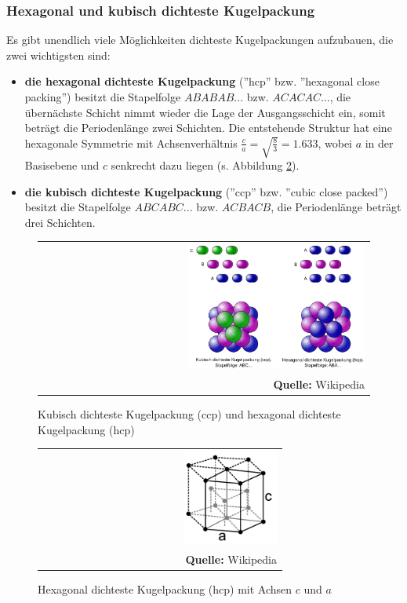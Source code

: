 \documentclass[a4paper,titlepage]{scrartcl}
\numberwithin{equation}{section}
\begin{document}
\subsubsection{Hexagonal und kubisch dichteste Kugelpackung}
Es gibt unendlich viele Möglichkeiten dichteste Kugelpackungen aufzubauen, die zwei wichtigsten sind:
\begin{itemize}
\item \textbf{die hexagonal dichteste Kugelpackung} (''hcp'' bzw. ''hexagonal close packing'') besitzt die Stapelfolge $ABABAB...$ bzw. $ACACAC...$, die übernächste Schicht nimmt wieder die Lage der Ausgangsschicht ein, somit beträgt die Periodenlänge zwei Schichten. Die entstehende Struktur hat eine hexagonale Symmetrie mit Achsenverhältnis $\frac{c}{a}=\sqrt{\frac{8}{3}}=1.633$, wobei $a$ in der Basisebene und $c$ senkrecht dazu liegen (s. Abbildung \ref{fig:hexagonalkugel}).
\item \textbf{die kubisch dichteste Kugelpackung} (''ccp'' bzw. ''cubic close packed'') besitzt die Stapelfolge $ABCABC...$ bzw. $ACBACB$, die Periodenlänge beträgt drei Schichten.
\end{itemize}
\begin{figure}[H]
	\centering
	\begin{tabular}{@{}r@{}}
		\includegraphics[width=0.55\textwidth]{images/DichtesteKugelpackung.png}\\
		\footnotesize\sffamily\textbf{Quelle:} Wikipedia \cite{wiki:kugelpackung}
	\end{tabular}
	\caption{Kubisch dichteste Kugelpackung (ccp) und hexagonal dichteste Kugelpackung (hcp)}
    \label{fig:dichtestepackung}
\end{figure}
\begin{figure}[H]
\centering
	\begin{tabular}{@{}r@{}}
		\includegraphics[width=0.4\textwidth]{images/hexagonalkugelpackung.png}\\
		\footnotesize\sffamily\textbf{Quelle:} Wikipedia
	\end{tabular}
	\caption{Hexagonal dichteste Kugelpackung (hcp) mit Achsen $c$ und $a$}
    \label{fig:hexagonalkugel}
\end{figure}
\end{document}
